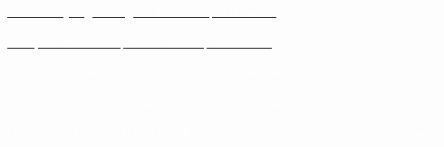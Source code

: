 \documentclass[t]{beamer}
\begin{document}
%

{
\begin{frame}
\tinyfill \href{https://upload.wikimedia.org/wikipedia/commons/thumb/7/7d/Harmonia_axyridis01.jpg/974px-Harmonia_axyridis01.jpg}{\textcolor{white}{Asian Ladybugs collage © Entomart, Wikimedia, \ccbync{}}}
\end{frame}
}

%

{
\begin{frame}
\tinyfill \href{https://en.wikipedia.org/wiki/European_bee-eater\#/media/File:Merops_apiaster_04.jpg}{\textcolor{white}{European Bee-Eater, Pierre Dalous, Wikimedia, }}
\end{frame}
}

%

{
\begin{frame}
\tinyfill \textcolor{white}{Fence Lizard photo by Dustin Siegel, with permission.}
\end{frame}
}

%

{
\begin{frame}
\tinyfill \textcolor{white}{Baby spiders, C. Frank Sharmer, Creative Commons.}
\end{frame}
}

%

{
\begin{frame}
\tinyfill \textcolor{white}{Dandelion photo by David Carillet, www.wildretina.com, Creative Commons.}
\end{frame}
}

%
\end{document}
